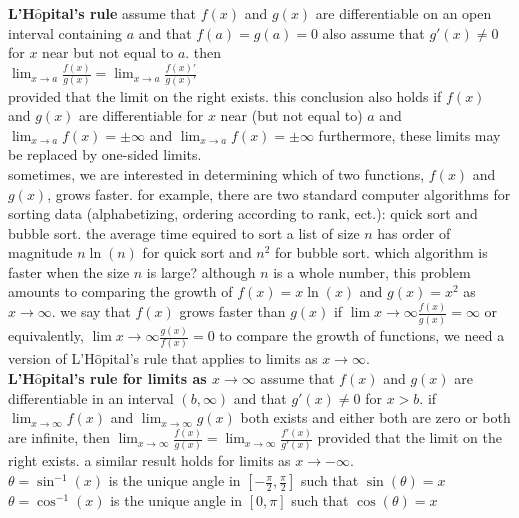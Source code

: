 \documentclass{article}
\begin{document}
\textbf{L'H$\hat{\text{o}}$pital's rule} assume that $f(x)$ and $g(x)$ are differentiable on an open interval containing $a$ and that $f(a) = g(a) = 0$ also assume that $g'(x) \neq 0$ for $x$ near but not equal to $a$. then\\

$\lim_{x \to a}\frac{f(x)}{g(x)} = \lim_{x \to a}\frac{f(x)'}{g(x)'}$\\ 

provided that the limit on the right exists. this conclusion also holds if $f(x)$ and $g(x)$ are differentiable for $x$ near (but not equal to) $a$ and\\ $\lim_{x \to a}f(x) = \pm\infty$ and $\lim_{x \to a}f(x) = \pm\infty$ furthermore, these limits may be replaced by one-sided limits.\\

sometimes, we are interested in determining which of two functions, $f(x)$ and $g(x)$, grows faster. for example, there are two standard computer algorithms for sorting data (alphabetizing, ordering according to rank, ect.): quick sort and bubble sort. the average time equired to sort a list of size $n$ has order of magnitude $n\ln(n)$ for quick sort and $n^2$ for bubble sort. which algorithm is faster when the size $n$ is large? although $n$ is a whole number, this problem amounts to comparing the growth of $f(x) = x\ln(x)$ and $g(x) = x^2$ as $x \to \infty$. we say that $f(x)$ grows faster than $g(x)$ if $\lim{x \to \infty}\frac{f(x)}{g(x)} = \infty$ or equivalently, $\lim{x \to \infty}\frac{g(x)}{f(x)} = 0$ to compare the growth of functions, we need a version of L'H$\hat{\text{o}}$pital's rule that applies to limits as $x \to \infty$.\\

\textbf{L'H$\hat{\text{o}}$pital's rule for limits as $x \to \infty$} assume that $f(x)$ and $g(x)$ are differentiable in an interval $(b, \infty)$ and that $g'(x) \neq 0$ for $x > b$. if $\lim_{x \to \infty}f(x)$ and $\lim_{x \to \infty}g(x)$ both exists and either both are zero or both are infinite, then $\lim_{x \to \infty}\frac{f(x)}{g(x)} = \lim_{x \to \infty}\frac{f'(x)}{g'(x)}$ provided that the limit on the right exists. a similar result holds for limits as $x \to -\infty$.\\

$\theta = \sin^{-1}(x)$ is the unique angle in $[-\frac{\pi}{2}, \frac{\pi}{2}]$ such that $\sin(\theta) = x$\\
$\theta = \cos^{-1}(x)$ is the unique angle in $[0, \pi]$ such that $\cos(\theta) = x$\\
\end{document}

